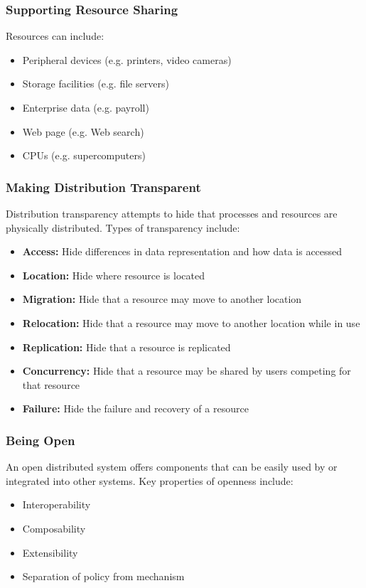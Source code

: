 \documentclass[12pt,titlepage]{article}
\begin{document}
      \subsubsection{Supporting Resource Sharing}
        Resources can include:
        \begin{itemize}
          \item Peripheral devices (e.g. printers, video cameras)
          \item Storage facilities (e.g. file servers)
          \item Enterprise data (e.g. payroll)
          \item Web page (e.g. Web search)
          \item CPUs (e.g. supercomputers)
        \end{itemize}

      \subsubsection{Making Distribution Transparent}
        Distribution transparency attempts to hide that processes and resources are physically distributed. Types of transparency include:
        \begin{itemize}
          \item \textbf{Access:} Hide differences in data representation and how data is accessed
          \item \textbf{Location:} Hide where resource is located
          \item \textbf{Migration:} Hide that a resource may move to another location
          \item \textbf{Relocation:} Hide that a resource may move to another location while in use
          \item \textbf{Replication:} Hide that a resource is replicated
          \item \textbf{Concurrency:} Hide that a resource may be shared by users competing for that resource
          \item \textbf{Failure:} Hide the failure and recovery of a resource
        \end{itemize}

      \subsubsection{Being Open}
        An open distributed system offers components that can be easily used by or integrated into other systems. Key properties of openness
        include:
        \begin{itemize}
          \item Interoperability
          \item Composability
          \item Extensibility
          \item Separation of policy from mechanism
        \end{itemize}
\end{document}
